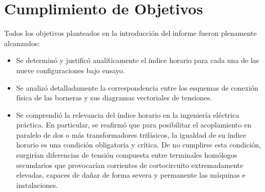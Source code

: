\section{Cumplimiento de Objetivos}
Todos los objetivos planteados en la introducción del informe fueron plenamente alcanzados:
\begin{itemize}
    \item Se determinó y justificó analíticamente el índice horario para cada una de las nueve configuraciones bajo ensayo.
    \item Se analizó detalladamente la correspondencia entre los esquemas de conexión física de las borneras y sus diagramas
    vectoriales de tensiones.
    \item Se comprendió la relevancia del índice horario en la ingeniería eléctrica práctica. En particular, se reafirmó
    que para posibilitar el acoplamiento en paralelo de dos o más transformadores trifásicos, la igualdad de su índice
    horario es una condición obligatoria y crítica. De no cumplirse esta condición, surgirían diferencias de tensión
    compuesta entre terminales homólogos secundarios que provocarían corrientes de cortocircuito extremadamente elevadas,
    capaces de dañar de forma severa y permanente las máquinas e instalaciones.
\end{itemize}
